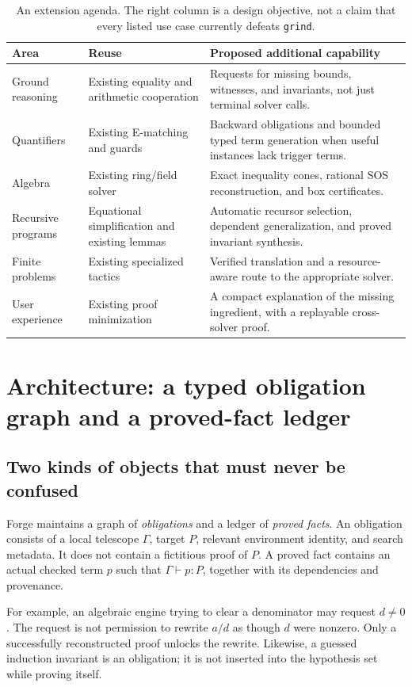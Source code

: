 \documentclass[11pt,a4paper]{article}
\newcommand{\grind}{\texttt{grind}}
\begin{document}
\begin{table}[htbp]
\centering\small
\begin{tabularx}{\textwidth}{@{}p{33mm}XX@{}}
\toprule
\textbf{Area} & \textbf{Reuse} & \textbf{Proposed additional capability}\\
\midrule
Ground reasoning & Existing equality and arithmetic cooperation & Requests for missing bounds, witnesses, and invariants, not just terminal solver calls.\\
Quantifiers & Existing E-matching and guards & Backward obligations and bounded typed term generation when useful instances lack trigger terms.\\
Algebra & Existing ring/field solver & Exact inequality cones, rational SOS reconstruction, and box certificates.\\
Recursive programs & Equational simplification and existing lemmas & Automatic recursor selection, dependent generalization, and proved invariant synthesis.\\
Finite problems & Existing specialized tactics & Verified translation and a resource-aware route to the appropriate solver.\\
User experience & Existing proof minimization & A compact explanation of the missing ingredient, with a replayable cross-solver proof.\\
\bottomrule
\end{tabularx}
\caption{An extension agenda. The right column is a design objective, not a claim that every listed use case currently defeats \grind.}
\end{table}

\section{Architecture: a typed obligation graph and a proved-fact ledger}
\subsection{Two kinds of objects that must never be confused}
Forge maintains a graph of \emph{obligations} and a ledger of \emph{proved facts}. An obligation consists of a local telescope $\Gamma$, target $P$, relevant environment identity, and search metadata. It does not contain a fictitious proof of $P$. A proved fact contains an actual checked term $p$ such that $\Gamma\vdash p:P$, together with its dependencies and provenance.

For example, an algebraic engine trying to clear a denominator may request $d\ne0$. The request is not permission to rewrite $a/d$ as though $d$ were nonzero. Only a successfully reconstructed proof unlocks the rewrite. Likewise, a guessed induction invariant is an obligation; it is not inserted into the hypothesis set while proving itself.
\end{document}
